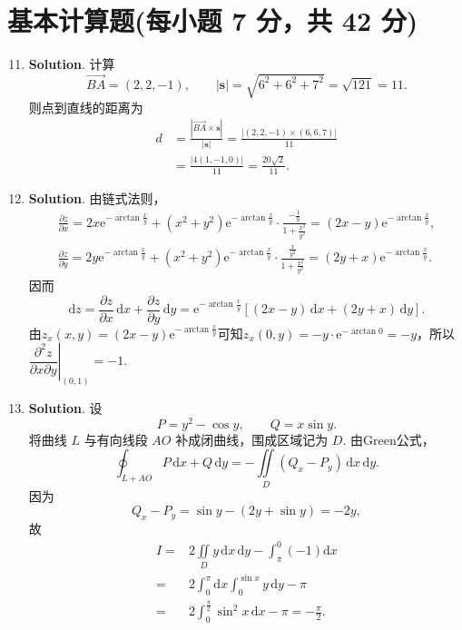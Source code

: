 \documentclass[../main.tex]{subfiles}
\begin{document}
\section{基本计算题(每小题 7 分，共 42 分)}
\begin{enumerate}
    \setcounter{enumi}{10}
    \item \textbf{Solution}. 计算
          \[
              \overrightarrow{BA}=(2,2,-1),\qquad |\boldsymbol{s}|=\sqrt{6^2+6^2+7^2}=\sqrt{121}=11.
          \]
          则点到直线的距离为
          \[
              \begin{aligned}
                  d & =\frac{|\overrightarrow{BA}\times \boldsymbol{s}|}{|\boldsymbol{s}|}
                  =\frac{|(2,2,-1)\times (6,6,7)|}{11}                                     \\
                    & =\frac{|4(1,-1,0)|}{11}
                  =\frac{20\sqrt2}{11}.
              \end{aligned}
          \]

    \item \textbf{Solution}. 由链式法则，
          \[
              \begin{gathered}
                  \frac{\partial z}{\partial x}=2x\mathrm{e}^{-\arctan\frac{x}{y}}+\left(x^2+y^2\right)\mathrm{e}^{-\arctan\frac{x}{y}}\cdot\frac{-\frac{1}{y}}{1+\frac{x^2}{y^2}}=(2x-y)\mathrm{e}^{-\arctan\frac{x}{y}},\\
                  \frac{\partial z}{\partial y}=2y\mathrm{e}^{-\arctan\frac{x}{y}}+\left(x^2+y^2\right)\mathrm{e}^{-\arctan\frac{x}{y}}\cdot\frac{\frac{x}{y^2}}{1+\frac{x^2}{y^2}}=(2y+x)\mathrm{e}^{-\arctan\frac{x}{y}}.
              \end{gathered}
          \]
          因而
          \[
              \mathrm{d}z=\frac{\partial z}{\partial x}\,\mathrm{d}x+\frac{\partial z}{\partial y}\,\mathrm{d}y=\mathrm{e}^{-\arctan\frac{x}{y}}\left[(2x-y)\,\mathrm{d}x+(2y+x)\,\mathrm{d}y\right].
          \]
          由$z_x(x,y)=(2x-y)\mathrm{e}^{-\arctan\frac{x}{y}}$可知$z_x(0,y)=-y\cdot\mathrm{e}^{-\arctan 0}=-y$，所以$\left.\dfrac{\partial^2z}{\partial x\partial y}\right|_{(0,1)}=-1$.


    \item \textbf{Solution}. 设
          \[
              P=y^2-\cos y,\qquad Q=x\sin y.
          \]
          将曲线 \(L\) 与有向线段 \(AO\) 补成闭曲线，围成区域记为 \(D\). 由Green公式，
          \[
              \oint_{L+AO}P\,\mathrm{d}x+Q\,\mathrm{d}y
              =-\iint\limits_D(Q_x-P_y)\,\mathrm{d}x\,\mathrm{d}y.
          \]
          因为
          \[
              Q_x-P_y=\sin y-(2y+\sin y)=-2y,
          \]
          故
          \[
              \begin{aligned}
                  I= {} & 2\iint\limits_D y\,\mathrm{d}x\,\mathrm{d}y - \int_{\pi}^{0} (-1)\mathrm{d}x \\
                  = {}  & 2\int_0^{\pi}\mathrm{d}x\int_0^{\sin x} y\,\mathrm{d}y - \pi                 \\
                  = {}  & 2\int_0^{\frac{\pi}{2}}\sin^2 x\,\mathrm{d}x - \pi=-\frac{\pi}{2}.
              \end{aligned}
          \]


\end{enumerate}
\end{document}

